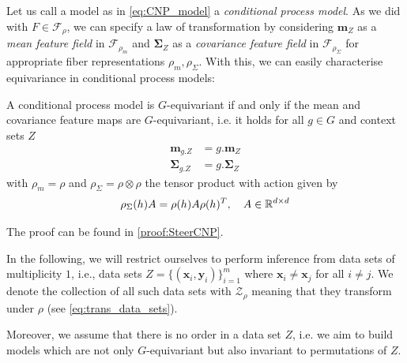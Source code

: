 Let us call a model as in \cref{eq:CNP_model} a \emph{conditional process model}.
As we did with $F\in\mathcal{F}_\rho$, we can specify a law of transformation by considering $\mathbf{m}_Z$ as a \emph{mean feature field} in $\mathcal{F}_{\rho_m}$ and $\mathbf{\Sigma}_Z$ as a \emph{covariance feature field} in $\mathcal{F}_{\rho_{\Sigma}}$ for appropriate fiber representations $\rho_m,\rho_\Sigma$.
With this, we can easily characterise equivariance in conditional process models: \begin{proposition} \label{prop:SteerCNP} A conditional process model is $G$-equivariant if and only if the mean and covariance feature maps are $G$-equivariant, i.e. it holds for all $g\in G$ and context sets $Z$ \begin{align} \label{eq:mean_equiv_constraint} \mathbf{m}_{g.Z} & =g.
              \mathbf{m}_{Z}                                          \\
              \label{eq:sigma_equiv_constraint}
              \mathbf{\Sigma}_{g.
              Z}                                                & =g.
              \mathbf{\Sigma}_{Z}
	\end{align}
	with $\rho_{m}=\rho$ and $\rho_\Sigma=\rho\otimes\rho$ the tensor product with action given by
	\begin{align}
		\label{eq:tensor_product_representation_sigma}
		\rho_{\Sigma}(h)A=\rho(h)A\rho(h)^T, \quad A \in \mathbb{R}^{d\times d}
	\end{align}
\end{proposition}

The proof can be found in \cref{proof:SteerCNP}.

In the following, we will restrict ourselves to perform inference from data sets of multiplicity $1$, i.e., data sets $Z=\{(\mathbf{x}_i,\mathbf{y}_i)\}_{i=1}^{m}$ where $\mathbf{x}_i \neq \mathbf{x}_j$ for all $i\neq j$.
We denote the collection of all such data sets with $\mathcal{Z}_{\rho}$ meaning that they transform under $\rho$ (see \cref{eq:trans_data_sets}).

Moreover, we assume that there is no order in a data set $Z$, i.e. we aim to build models which are not only $G$-equivariant but also invariant to permutations of $Z$.

